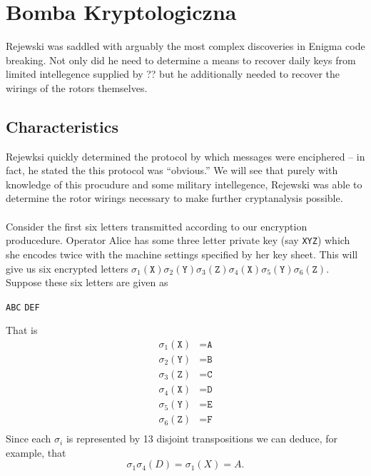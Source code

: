 \chapter{Bomba Kryptologiczna}

Rejewski was saddled with arguably the most complex discoveries in
Enigma code breaking. Not only did he need to determine a means to
recover daily keys from limited intellegence supplied by ?? but he
additionally needed to recover the wirings of the rotors themselves.
\section{Characteristics}
Rejewksi quickly determined the protocol by which messages were
enciphered -- in fact, he stated the this protocol was ``obvious.''
We will see that purely with knowledge of this procudure and some
military intellegence, Rejewski was able to determine the rotor
wirings necessary to make further cryptanalysis possible.
\\\\Consider the first six letters transmitted according to our
encryption producedure. Operator Alice has some three letter private
key (say \texttt{XYZ}) which she encodes twice with the machine
settings specified by her key sheet. This will give us six encrypted
letters
$\sigma_1(\texttt{X})\sigma_2(\texttt{Y})\sigma_3(\texttt{Z})\sigma_4(\texttt{X})\sigma_5(\texttt{Y})\sigma_6(\texttt{Z})$.
Suppose these six letters are given as
\begin{center}
	\texttt{ABC} \texttt{DEF}
\end{center}
That is
\begin{align*}
	\sigma_1(\texttt{X}) & = \texttt{A} \\
	\sigma_2(\texttt{Y}) & = \texttt{B} \\
	\sigma_3(\texttt{Z}) & = \texttt{C} \\
	\sigma_4(\texttt{X}) & = \texttt{D} \\
	\sigma_5(\texttt{Y}) & = \texttt{E} \\
	\sigma_6(\texttt{Z}) & = \texttt{F} \\
\end{align*}
Since each $\sigma_i$ is represented by 13 disjoint transpositions we
can deduce, for example, that
\[
	\sigma_1\sigma_4(D) = \sigma_1(X) = A.
\]
